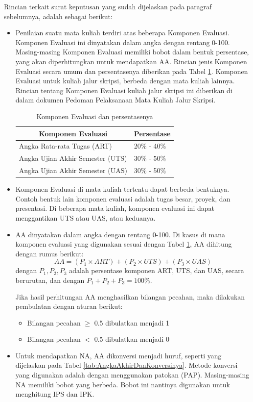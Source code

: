 Rincian terkait surat keputusan yang sudah dijelaskan pada paragraf sebelumnya, adalah sebagai berikut:
\begin{itemize}
	\item Penilaian suatu mata kuliah terdiri atas beberapa Komponen Evaluasi. Komponen Evaluasi ini  dinyatakan dalam angka dengan rentang 0-100. Masing-masing Komponen Evaluasi memiliki bobot dalam bentuk persentase, yang akan diperhitungkan untuk mendapatkan AA. Rincian jenis Komponen Evaluasi secara umum dan persentasenya diberikan pada Tabel \ref{tab:KomponenEvaluasiDanPersentasenya}. Komponen Evaluasi untuk kuliah jalur skripsi, berbeda dengan mata kuliah lainnya. Rincian tentang Komponen Evaluasi kuliah jalur skripsi ini diberikan di dalam dokumen Pedoman Pelaksanaan Mata Kuliah Jalur Skripsi.
	
	\begin{table}
		\centering
		\caption{Komponen Evaluasi dan persentasenya}
			\begin{tabular}{|p{4.5cm}|p{3.5cm}|}
			\hline
				\multicolumn{1}{|c|}{\textbf{Komponen Evaluasi}} & \multicolumn{1}{c|}{\textbf{Persentase}} \\ \hline
				Angka Rata-rata Tugas (ART) & 20\% - 40\% \\ \hline
				Angka Ujian Akhir Semester (UTS) & 30\% - 50\% \\ \hline
				Angka Ujian Akhir Semester (UAS) & 30\% - 50\% \\ \hline
			\end{tabular}
		\label{tab:KomponenEvaluasiDanPersentasenya}
	\end{table}
	
	\item Komponen Evaluasi di mata kuliah tertentu dapat berbeda bentuknya. Contoh bentuk lain komponen evaluasi adalah tugas besar, proyek, dan presentasi. Di beberapa mata kuliah, komponen evaluasi ini dapat menggantikan UTS atau UAS, atau keduanya.
	
	\item AA dinyatakan dalam angka dengan rentang 0-100. Di kasus di mana komponen evaluasi yang digunakan sesuai dengan Tabel \ref{tab:KomponenEvaluasiDanPersentasenya}, AA dihitung dengan rumus berikut:
		\[AA  = (P_{1} \times ART)+(P_{2} \times UTS)+(P_{3} \times UAS)\]
		dengan $P_{1},P_{2},P_{3}$ adalah persentase komponen ART, UTS, dan UAS, secara berurutan, dan dengan $P_{1}+P_{2}+P_{3} = 100\%$.
		
		Jika hasil perhitungan AA menghasilkan bilangan pecahan, maka dilakukan pembulatan dengan	aturan berikut:
		\begin{itemize}
			\item Bilangan pecahan $\geq$ 0.5 dibulatkan menjadi 1
			\item Bilangan pecahan $<$ 0.5 dibulatkan menjadi 0
		\end{itemize}
		\item Untuk mendapatkan NA, AA dikonversi menjadi huruf, seperti yang dijelaskan pada Tabel \ref{tab:AngkaAkhirDanKonversinya}. Metode konversi yang digunakan adalah dengan menggunakan patokan (PAP). Masing-masing NA memiliki bobot yang berbeda. Bobot ini nantinya digunakan untuk menghitung IPS dan IPK.
		

\end{itemize}
